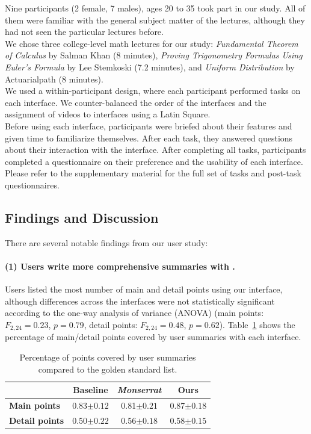 Nine participants (2 female, 7 males), ages 20 to 35 took part in our study. 
All of them were familiar with the general subject matter of the lectures, although they had not seen the particular lectures before.\\
%
We chose three college-level math lectures for our study: \textit{Fundamental Theorem of Calculus} by Salman Khan (8 minutes), \textit{Proving Trigonometry Formulas Using Euler's Formula} by Lee Stemkoski (7.2 minutes), and \textit{Uniform Distribution} by Actuarialpath (8 minutes).\\
We used a within-participant design, where each participant performed tasks on each interface. We counter-balanced the order of the interfaces and the assignment of videos to interfaces using a Latin Square.\\
Before using each interface, participants were briefed about their features and given time to familiarize themselves. After each task, they answered questions about their interaction with the interface. After completing all tasks, participants completed a questionnaire on their preference and the usability of each interface. Please refer to the supplementary material for the full set of tasks and post-task questionnaires.
\subsection{Findings and Discussion}
There are several notable findings from our user study:

\paragraph{(1) Users write more comprehensive summaries with \systemname .}
Users listed the most number of main and detail points using our interface,
although differences across the interfaces were not statistically significant
according to the one-way analysis of variance (ANOVA) (main points:
$F_{2,24}=0.23$, $p=0.79$, detail points: $F_{2,24}=0.48$, $p=0.62$). Table~\ref{Tab:summary_results} shows the percentage of main/detail
points covered by user summaries with each interface.

\begin{table}[!h]
 \centering
 \begin{tabular}{ l |c c c}
 \hline
    & \textbf{Baseline} & \textbf{\textit{Monserrat}} & \textbf{Ours} \\\hline
   \textbf{Main points} & 0.83$\pm0.12$ & 0.81$\pm0.21$ & 0.87$\pm0.18$\\
   \textbf{Detail points} & 0.50$\pm0.22$ & 0.56$\pm0.18$ & 0.58$\pm0.15$\\
   \hline
 \end{tabular}
 \caption{Percentage of points covered by user summaries compared to the
golden standard list.}
 \label{Tab:summary_results}
\end{table}

